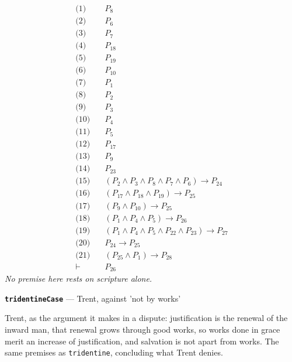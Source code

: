 \documentclass[11pt]{article}
\begin{document}
\begin{align*}
  \text{(1)} \quad & P_{8} \\
  \text{(2)} \quad & P_{6} \\
  \text{(3)} \quad & P_{7} \\
  \text{(4)} \quad & P_{18} \\
  \text{(5)} \quad & P_{19} \\
  \text{(6)} \quad & P_{10} \\
  \text{(7)} \quad & P_{1} \\
  \text{(8)} \quad & P_{2} \\
  \text{(9)} \quad & P_{3} \\
  \text{(10)} \quad & P_{4} \\
  \text{(11)} \quad & P_{5} \\
  \text{(12)} \quad & P_{17} \\
  \text{(13)} \quad & P_{9} \\
  \text{(14)} \quad & P_{23} \\
  \text{(15)} \quad & (P_{2} \land P_{3} \land P_{8} \land P_{7} \land P_{6}) \rightarrow P_{24} \\
  \text{(16)} \quad & (P_{17} \land P_{18} \land P_{19}) \rightarrow P_{25} \\
  \text{(17)} \quad & (P_{9} \land P_{10}) \rightarrow P_{25} \\
  \text{(18)} \quad & (P_{1} \land P_{4} \land P_{5}) \rightarrow P_{26} \\
  \text{(19)} \quad & (P_{1} \land P_{4} \land P_{5} \land P_{22} \land P_{23}) \rightarrow P_{27} \\
  \text{(20)} \quad & P_{24} \rightarrow P_{25} \\
  \text{(21)} \quad & (P_{25} \land P_{1}) \rightarrow P_{28} \\
  \vdash \quad & P_{26}
\end{align*}
\emph{No premise here rests on scripture alone.}
\par\medskip\noindent\textbf{\texttt{tridentine\allowbreak{}Case}} --- Trent, against 'not by works'\par\nobreak\noindent
Trent, as the argument it makes in a dispute: justification is the renewal of the inward man, that renewal grows through good works, so works done in grace merit an increase of justification, and salvation is not apart from works. The same premises as \texttt{tridentine}, concluding what Trent denies.
\end{document}
